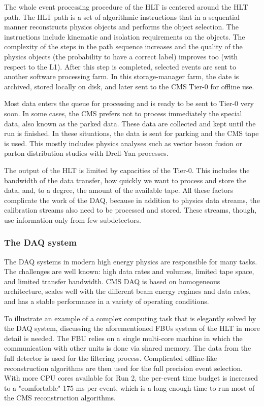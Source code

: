 \begin{normalsize}
The whole event processing procedure of the HLT is centered around the HLT path. The HLT path is a set of algorithmic instructions that in a sequential manner reconstructs physics objects and performs the object selection. The instructions include kinematic and isolation requirements on the objects. The complexity of the steps in the path sequence increases and the quality of the physics objects (the probability to have a correct label) improves too (with respect to the L1). After this step is completed, selected events are sent to another software processing farm. In this storage-manager farm, the date is archived, stored locally on disk, and later sent to the CMS Tier-0 for offline use. 

Most data enters the queue for processing and is ready to be sent to Tier-0 very soon. In some cases, the CMS prefers not to process immediately the special data, also known as the parked data. These data are collected and kept until the run is finished. In these situations, the data is sent for parking and the CMS tape is used. This mostly includes physics analyses such as vector boson fusion or parton distribution studies with Drell-Yan processes.

The output of the HLT is limited by capacities of the Tier-0. This includes the bandwidth of the data transfer, how quickly we want to process and store the data, and, to a degree, the amount of the available tape.  All these factors complicate the work of the DAQ, because in addition to physics data streams, the calibration streams also need to be processed and stored. These streams, though, use information only from few subdetectors. 



\subsubsection{The DAQ system}


The DAQ systems in modern high energy physics are responsible for many tasks. The challenges are well known: high data rates and volumes, limited tape space, and limited transfer bandwidth. CMS DAQ is based on homogeneous architecture, scales well with the different beam energy regimes and data rates, and has a stable performance in a variety of operating conditions. 

To illustrate an example of a complex computing task that is elegantly solved by the DAQ system, discussing the aforementioned FBUs system of the HLT in more detail is needed. The FBU relies on a single multi-core machine in which the communication with other units is done via shared memory. The data from the full detector is used for the filtering process. Complicated offline-like reconstruction algorithms are then used for the full precision event selection. With more CPU cores available for Run 2, the per-event time budget is increased to a "comfortable" 175 ms per event, which is a long enough time to run most of the CMS reconstruction algorithms. 


\end{normalsize}
